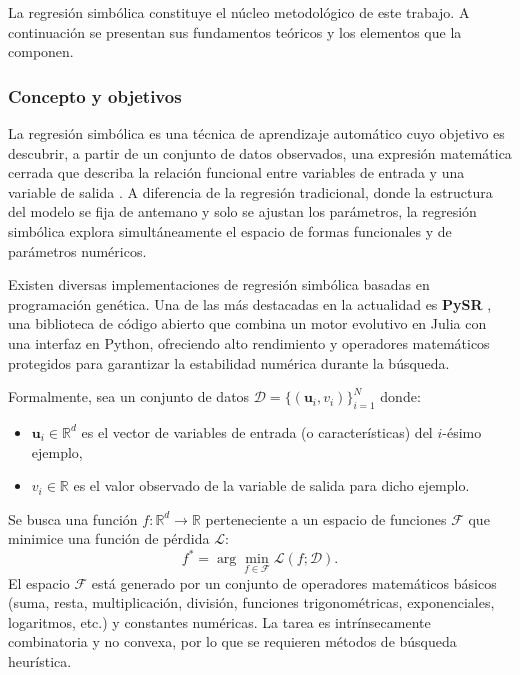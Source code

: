\documentclass[12pt,a4paper]{article}
\newcommand{\R}{\mathbb{R}}
\newcommand{\loss}{\mathcal{L}}
\newcommand{\dataset}{\mathcal{D}}
\begin{document}
La regresión simbólica constituye el núcleo metodológico de este trabajo. A continuación se presentan sus fundamentos teóricos y los elementos que la componen.

\subsubsection*{Concepto y objetivos}

La regresión simbólica es una técnica de aprendizaje automático cuyo objetivo es descubrir, a partir de un conjunto de datos observados, una expresión matemática cerrada que describa la relación funcional entre variables de entrada y una variable de salida \cite{koza1992genetic}. A diferencia de la regresión tradicional, donde la estructura del modelo se fija de antemano y solo se ajustan los parámetros, la regresión simbólica explora simultáneamente el espacio de formas funcionales y de parámetros numéricos.

Existen diversas implementaciones de regresión simbólica basadas en programación genética. Una de las más destacadas en la actualidad es \textbf{PySR} \cite{cranmer2023pysr}, una biblioteca de código abierto que combina un motor evolutivo en Julia con una interfaz en Python, ofreciendo alto rendimiento y operadores matemáticos protegidos para garantizar la estabilidad numérica durante la búsqueda.

Formalmente, sea un conjunto de datos \(\dataset = \{(\mathbf{u}_i, v_i)\}_{i=1}^{N}\) donde:
\begin{itemize}
    \item \(\mathbf{u}_i \in \R^d\) es el vector de variables de entrada (o características) del \(i\)-ésimo ejemplo,
    \item \(v_i \in \R\) es el valor observado de la variable de salida para dicho ejemplo.
\end{itemize}
Se busca una función \(f: \R^d \to \R\) perteneciente a un espacio de funciones \(\mathcal{F}\) que minimice una función de pérdida \(\loss\):
\begin{equation}
    f^* = \arg\min_{f \in \mathcal{F}} \loss(f; \dataset).
\end{equation}
El espacio \(\mathcal{F}\) está generado por un conjunto de operadores matemáticos básicos (suma, resta, multiplicación, división, funciones trigonométricas, exponenciales, logaritmos, etc.) y constantes numéricas. La tarea es intrínsecamente combinatoria y no convexa, por lo que se requieren métodos de búsqueda heurística.
\end{document}
